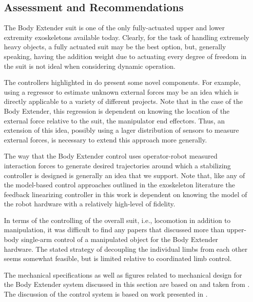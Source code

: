 \begin{refsection}
 
\subsection{Assessment and Recommendations}

The Body Extender suit is one of the only fully-actuated upper and lower extremity exoskeletons available today.  Clearly, for the task of handling extremely heavy objects, a fully actuated suit may be the best option, but, generally speaking, having the addition weight due to actuating every degree of freedom in the suit is not ideal when considering dynamic operation.  

The controllers highlighted in \cite{body_control_2012} do present some novel components.  For example, using a regressor to estimate unknown external forces may be an idea which is directly applicable to a variety of different projects.  Note that in the case of the Body Extender, this regression is dependent on knowing the location of the external force relative to the suit, the manipulator end effectors.  Thus, an extension of this idea, possibly using a lager distribution of sensors to measure external forces, is necessary to extend this approach more generally.  

The way that the Body Extender control uses operator-robot measured interaction forces to generate desired trajectories around which a stabilizing controller is designed is generally an idea that we support.  Note that, like any of the model-based control approaches outlined in the exoskeleton literature the feedback linearizing controller in this work is dependent on knowing the model of the robot hardware with a relatively high-level of fidelity.  

In terms of the controlling of the overall suit, i.e., locomotion in addition to manipulation, it was difficult to find any papers that discussed more than upper-body single-arm control of a manipulated object for the Body Extender hardware.  The stated strategy of decoupling the individual limbs from each other seems somewhat feasible, but is limited relative to coordinated limb control. 

 The mechanical specifications as well as figures related to mechanical design for the Body Extender system discussed in this section are based on and taken from \cite{body_design_2011}.  The discussion of the control system is based on work presented in \cite{body_control_2012}.

\printbibliography[heading=subbibliography]

\end{refsection}
  
% 









